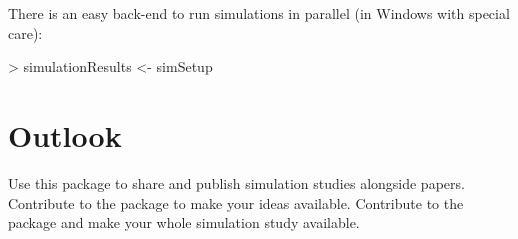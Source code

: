 \documentclass[article]{ajs}
\begin{document}
There is an easy back-end to run simulations in parallel (in Windows with special care):

\begin{Schunk}
\begin{Sinput}
> simulationResults <- simSetup %>% sim(R = 500, parallel = TRUE, mc.cores = 8)
\end{Sinput}
\end{Schunk}

\section{Outlook}
Use this package to share and publish simulation studies alongside papers. Contribute to the package to make your ideas available. Contribute to the package and make your whole simulation study available. 


%

\end{document}
